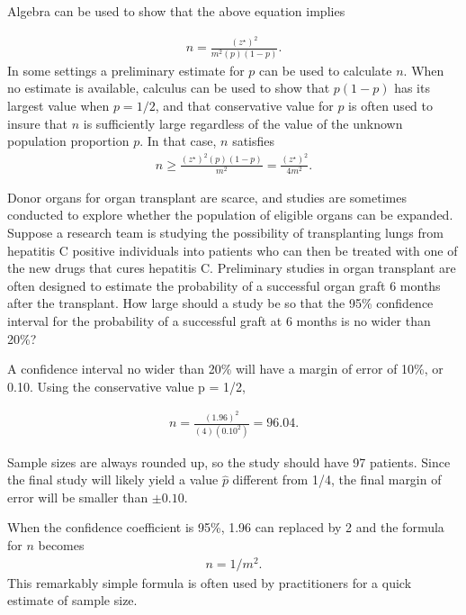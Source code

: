 Algebra can be used to show that the above equation implies

\begin{align*}
n = \frac{(z^{\star})^2}{m^2(p)(1 - p)}.
\end{align*}
In some settings a preliminary estimate for $p$ can be used to calculate $n$.  When no estimate is available, calculus can be used to show that $p(1 - p)$ has its largest value when $p = 1/2$, and that conservative value for $p$ is often used to insure that $n$ is sufficiently large regardless of the value of the unknown population proportion $p$.  In  that case, $n$ satisfies
\begin{align*}
  n \geq \frac{(z^{\star})^2(p)(1-p)}{m^2} = \frac{(z^{\star})^2}{4m^2}.
\end{align*}

\begin{example} {Donor organs for organ transplant are scarce, and studies are sometimes conducted to explore whether the population of eligible organs can be expanded. Suppose a research team is studying the possibility of transplanting lungs from hepatitis C positive individuals into patients who can then be treated with one of the new drugs that cures hepatitis C. Preliminary studies in organ transplant are often designed to estimate the probability of a successful organ graft 6 months after the transplant.  How large should a study be so that the 95\% confidence interval for the probability of a successful graft at 6 months is no wider than 20\%?}

A confidence interval no wider than 20\% will have a margin of error of 10\%, or 0.10.  Using the conservative value p = 1/2,

 \begin{align*}
    n = \frac{(1.96)^2}{(4)(0.10^2)} =  96.04.
\end{align*}

Sample sizes are always rounded up, so the study should have 97 patients.  Since the final study will likely yield a value $\hat{p}$ different from 1/4, the final margin of error will be smaller than $\pm 0.10$.
\end{example}

When the confidence coefficient is 95\%, 1.96 can replaced by 2 and the formula for $n$ becomes
\begin{align*}
  n = 1/m^2.
\end{align*}
This remarkably simple formula is often used by practitioners for a quick estimate of sample size.


